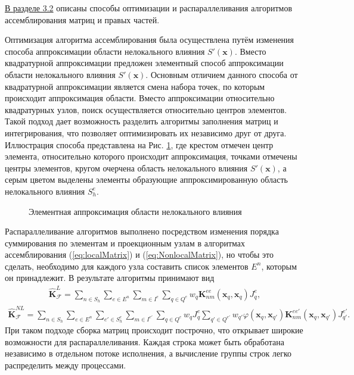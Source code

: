 \underline{В разделе 3.2} описаны способы оптимизации и распараллеливания алгоритмов ассемблирования матриц и правых частей.

Оптимизация алгоритма ассемблирования была осуществлена путём изменения способа аппроксимации области нелокального влияния $S'(\boldsymbol{x})$. Вместо квадратурной аппроксимации предложен элементный способ аппроксимации области нелокального влияния $S'(\boldsymbol{x})$. Основным отличием данного способа от квадратурной аппроксимации является смена набора точек, по которым происходит аппроксимация области. Вместо аппроксимации относительно квадратурных узлов, поиск осуществляется относительно центров элементов. Такой подход дает возможность разделить алгоритмы заполнения матриц и интегрирования, что позволяет оптимизировать их независимо друг от друга. Иллюстрация способа представлена на Рис. \ref{fig:ApproxSE}, где крестом отмечен центр элемента, относительно которого происходит аппроксимация, точками отмечены центры элементов, кругом очерчена область нелокального влияния $S'(\boldsymbol{x})$, а серым цветом выделены элементы образующие аппроксимированную область нелокального влияния $S_h^e$.

\begin{figure}[ht]
    \caption{Элементная аппроксимация области нелокального влияния}\label{fig:ApproxSE}
\end{figure}

Распараллеливание алгоритмов выполнено посредством изменения порядка суммирования по элементам и проекционным узлам в алгоритмах ассемблирования (\ref{eq:localMatrix}) и (\ref{eq:NonlocalMatrix}), но чтобы это сделать, необходимо для каждого узла составить список элементов $E^n$, которым он принадлежит. В результате алгоритмы принимают вид
\begin{gather*}
	\widehat{\textbf{K}}^L_{\mathcal{F}} =
	\sum\limits_{n \in S_h}
	\sum\limits_{e \in E^n}
	\sum\limits_{m \in I^e}
	\sum\limits_{q \in Q^e}
	w_q \textbf{K}^{ee}_{nm} (\boldsymbol{x}_q, \boldsymbol{x}_q) J_q^e,
\end{gather*}
\begin{gather}
	\label{eq:ParallelNonlocalMatrix}
	\widehat{\textbf{K}}^{NL}_{\mathcal{F}} =
	\sum\limits_{n \in S_h}
	\sum\limits_{e \in E^n}
	\sum\limits_{e' \in S_h^e}
	\sum\limits_{m \in I^{e'}}
	\sum\limits_{q \in Q^e}
	w_q J_q^e
	\sum\limits_{q' \in Q^{e'}}
	w_{q'} \varphi(\boldsymbol{x}_q, \boldsymbol{x}_{q'}) 
	\textbf{K}_{nm}^{e e'}(\boldsymbol{x}_q, \boldsymbol{x}_{q'}) J_{q'}^{e'}.
\end{gather}
При таком подходе сборка матриц происходит построчно, что открывает широкие возможности для распараллеливания. Каждая строка может быть обработана независимо в отдельном потоке исполнения, а вычисление группы строк легко распределить между процессами.

